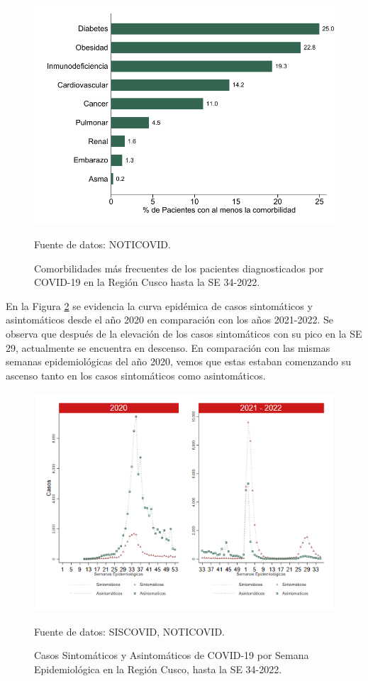 \documentclass[12pt,a4paper,openany]{book}
\begin{document}
	\begin{figure}[h]
				\caption{Comorbilidades más frecuentes de los pacientes diagnosticados por COVID-19 en la Región Cusco hasta la SE 34-2022. }\label{fig:comorbilidades}
		\begin{center}
			\includegraphics[width=0.65\linewidth]{../figuras/figura_comorbilidad.pdf}
		\end{center}
		{\footnotesize {Fuente de datos: NOTICOVID.}}
	\end{figure}
	\clearpage
	En la Figura \ref{fig:sintomaticos_asintomati} se evidencia la curva epidémica de casos sintomáticos y asintomáticos desde el año 2020 en comparación con los años 2021-2022. Se observa que después de la elevación de los casos sintomáticos con su pico en la SE 29, actualmente se encuentra en descenso. En comparación con las mismas semanas epidemiológicas del año 2020, vemos que estas estaban comenzando su ascenso tanto en los casos sintomáticos como asintomáticos.
	
	\begin{figure}[h]
		\caption{Casos Sintomáticos y Asintomáticos de COVID-19 por Semana Epidemiológica en la Región Cusco, hasta la SE 34-2022.  }\label{fig:sintomaticos_asintomati}
		
		\begin{center}
			\includegraphics[width=0.95\linewidth]{../figuras/sintomaticos_20_21_22.png}
		\end{center}
		{\footnotesize {Fuente de datos: SISCOVID, NOTICOVID.}}
	\end{figure}
	\clearpage
	
\end{document}
